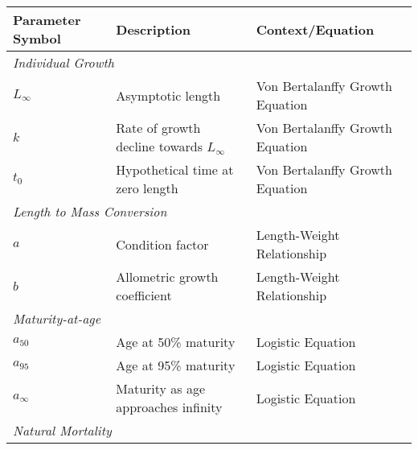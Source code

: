 
\begin{table}[ht]
\centering
\begin{tabular}{lll}
\hline
\textbf{Parameter Symbol} & \textbf{Description}                                                                                   & \textbf{Context/Equation}          \\ \hline
\multicolumn{3}{l}{\textit{Individual Growth}}                                                                                      \\
\(L_\infty\)              & Asymptotic length                                                                                      & Von Bertalanffy Growth Equation   \\
\(k\)                     & Rate of growth decline towards \(L_\infty\)                                                            & Von Bertalanffy Growth Equation   \\
\(t_0\)                   & Hypothetical time at zero length                                                                       & Von Bertalanffy Growth Equation   \\ \hline
\multicolumn{3}{l}{\textit{Length to Mass Conversion}}                                                                              \\
\(a\)                     & Condition factor                                                                                       & Length-Weight Relationship        \\
\(b\)                     & Allometric growth coefficient                                                                          & Length-Weight Relationship        \\ \hline
\multicolumn{3}{l}{\textit{Maturity-at-age}}                                                                                        \\
\(a_{50}\)                & Age at 50\% maturity                                                                                   & Logistic Equation                 \\
\(a_{95}\)                & Age at 95\% maturity                                                                                   & Logistic Equation                 \\
\(a_{\infty}\)            & Maturity as age approaches infinity                                                                     & Logistic Equation                 \\ \hline
\multicolumn{3}{l}{\textit{Natural Mortality}}                                                                                      \\

\end{tabular}
\end{table}

